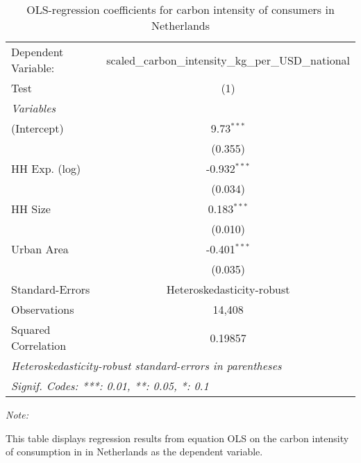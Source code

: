 
\begin{table}[htbp!]
   \centering
   \small
   \begin{adjustbox}{width = 1\textwidth, max height = 0.95\textheight, center}
      \begin{threeparttable}[b]
         \caption{\label{tab:OLS_1_NLD} OLS-regression coefficients for carbon intensity of consumers in Netherlands}
         \begin{tabular}{lc}
            \tabularnewline \midrule \midrule
            Dependent Variable: & scaled\_carbon\_intensity\_kg\_per\_USD\_national\\        
            Test                & (1)\\  
            \midrule
            \emph{Variables}\\
            (Intercept)         & 9.73$^{***}$\\   
                                & (0.355)\\   
            HH Exp. (log)       & -0.932$^{***}$\\   
                                & (0.034)\\   
            HH Size             & 0.183$^{***}$\\   
                                & (0.010)\\   
            Urban Area          & -0.401$^{***}$\\   
                                & (0.035)\\   
            \midrule 
            Standard-Errors     & Heteroskedasticity-robust \\   
            Observations        & 14,408\\  
            Squared Correlation & 0.19857\\  
            \midrule \midrule
            \multicolumn{2}{l}{\emph{Heteroskedasticity-robust standard-errors in parentheses}}\\
            \multicolumn{2}{l}{\emph{Signif. Codes: ***: 0.01, **: 0.05, *: 0.1}}\\
         \end{tabular}
         
         \begin{tablenotes}\item \medskip \textit{Note:}
            \item This table displays regression results from equation OLS on the carbon intensity of consumption in  in Netherlands as the dependent variable. 
         \end{tablenotes}
      \end{threeparttable}
   \end{adjustbox}
\end{table}


